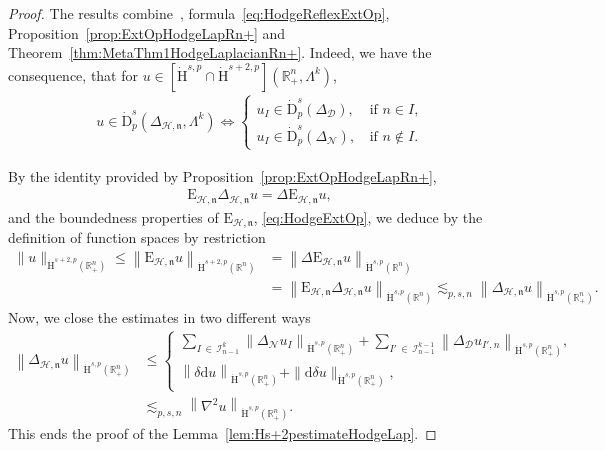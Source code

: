 \documentclass[10pt]{amsart}
\theoremstyle{definition}\newtheorem{defi}[theo]{Definition}\newtheorem{rema}[theo]{Remark}\newtheorem{exam}[theo]{Example}\newtheorem{exem}[theo]{Example}\newtheorem{nota}[theo]{Notation}
\newcommand{\bbR}{\mathbb{R}}
\newcommand{\rmH}{\mathrm{H}}%
\newcommand{\rmd}{\mathrm{d}}
\newcommand{\rmD}{\mathrm{D}}
\newcommand{\rmE}{\mathrm{E}}
\newcommand{\clH}{\mathcal{H}}
\newcommand{\clI}{\mathcal{I}}
\newcommand{\clN}{\mathcal{N}}
\newcommand{\clD}{\mathcal{D}}
\newcommand{\fkn}{\mathfrak{n}}
\begin{document}
\begin{proof}
The results combine~\cite[Propositions~5.4~\&~5.6]{Gaudin2022}, formula~\eqref{eq:HodgeReflexExtOp}, Proposition~\ref{prop:ExtOpHodgeLapRn+} and Theorem~\ref{thm:MetaThm1HodgeLaplacianRn+}. Indeed, we have the consequence, that for $u\in[\dot{\rmH}^{s,p}\cap\dot{\rmH}^{s+2,p}](\bbR^n_+,\Lambda^k)$,
\begin{align*}
u \in\dot{\rmD}^{s}_{p}\left({{\Delta}}_{\clH,\fkn},\Lambda^k\right) \Leftrightarrow
\begin{cases}
u_{I} \in \dot{\rmD}^{s}_{p}({{\Delta}}_{\clD}), \,& \text{if } n\in I\text{,}\\
u_{I} \in \dot{\rmD}^{s}_{p}({{\Delta}}_{\clN}),\,&\text{if } n\notin I.
\end{cases}
\end{align*}

By the identity provided by Proposition~\ref{prop:ExtOpHodgeLapRn+},
\begin{align*}
\rmE _{\clH,\fkn}{{\Delta}}_{\clH,\fkn}u = \Delta \rmE _{\clH,\fkn}u,
\end{align*}
and the boundedness properties of $\rmE _{\clH,\fkn}$, \eqref{eq:HodgeExtOp}, we deduce by the definition of function spaces by restriction
\begin{align*}
\| u \|_{\dot{\rmH}^{s+2,p}\left(\bbR^n_+\right)}\leqslant \left\| \rmE _{\clH,\fkn} u\right\|_{\dot{\rmH}^{s+2,p}\left(\bbR^n\right)} &= 
\left\| \Delta\rmE _{\clH,\fkn} u \right\|_{\dot{\rmH}^{s,p}\left(\bbR^n\right)}\\
&= \left\| \rmE _{\clH,\fkn}{{\Delta}}_{\clH,\fkn}u \right\|_{\dot{\rmH}^{s,p}\left(\bbR^n\right)} \lesssim_{p,s,n} \left\| {{\Delta}}_{\clH,\fkn}u \right\|_{\dot{\rmH}^{s,p}\left(\bbR^n_+\right)}.
\end{align*}
Now, we close the estimates in two different ways
\begin{align*}
\left\| {{\Delta}}_{\clH,\fkn}u \right\|_{\dot{\rmH}^{s,p}\left(\bbR^n_+\right)} &\leqslant
\begin{cases}
\sum\limits_{I\,\in\,\clI^{k}_{n-1}}
\left\| \Delta_{\clN} u_{I} \right\|_{\dot{\rmH}^{s,p}\left(\bbR^n_+\right)} + \sum\limits_{I'\,\in\,\clI^{k-1}_{n-1}}
\left\| \Delta_{\clD} u_{I',n} \right\|_{\dot{\rmH}^{s,p}\left(\bbR^n_+\right)},\\
\left\| \delta \rmd u \right\|_{\dot{\rmH}^{s,p}\left(\bbR^n_+\right)} + \| \rmd\delta u \|_{\dot{\rmH}^{s,p}\left(\bbR^n_+\right)},
\end{cases}\\
&\lesssim_{p,s,n} \left\| \nabla^2 u \right\|_{\dot{\rmH}^{s,p}\left(\bbR^n_+\right)}.
\end{align*}
This ends the proof of the Lemma~\ref{lem:Hs+2pestimateHodgeLap}.
\end{proof}
\end{document}
